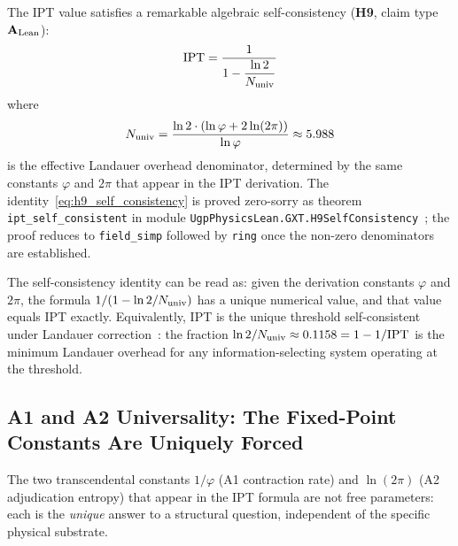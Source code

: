\documentclass[11pt,twocolumn]{article}
\newcommand{\CatAL}{\ensuremath{\textbf{A}_{\rm Lean}}}
\theoremstyle{remark}
\begin{document}
The IPT value satisfies a remarkable algebraic self-consistency (\textbf{H9}, claim type~$\CatAL$):
\begin{equation}
\label{eq:h9_self_consistency}
\text{IPT} = \frac{1}{1 - \dfrac{\ln 2}{N_{\rm univ}}}
\end{equation}
where
\[
  N_{\rm univ}
  = \frac{\ln 2 \cdot (\ln\varphi + 2\ln(2\pi))}{\ln\varphi}
  \approx 5.988
\]
is the effective Landauer overhead denominator, determined by the same
constants $\varphi$ and $2\pi$ that appear in the IPT derivation.  The
identity~\eqref{eq:h9_self_consistency} is proved zero-sorry as theorem
\texttt{ipt\_self\_consistent} in module
\texttt{UgpPhysicsLean.\allowbreak{}GXT.\allowbreak{}H9SelfConsistency}~\cite{SpivackUGPPhysicsLean};
the proof reduces to \texttt{field\_simp} followed by \texttt{ring} once the
non-zero denominators are established.

The self-consistency identity can be read as: given the derivation constants
$\varphi$ and $2\pi$, the formula $1/(1-\ln 2/N_{\rm univ})$ has a unique
numerical value, and that value equals IPT exactly.  Equivalently, IPT is
the unique threshold self-consistent under Landauer correction~\cite{Landauer1961}:
the fraction $\ln 2/N_{\rm univ} \approx 0.1158 = 1 - 1/\text{IPT}$ is the
minimum Landauer overhead for any information-selecting system operating at the
threshold.

\subsection{A1 and A2 Universality: The Fixed-Point Constants Are Uniquely Forced}
\label{sec:a1a2_universality}

The two transcendental constants $1/\varphi$ (A1 contraction rate) and
$\ln(2\pi)$ (A2 adjudication entropy) that appear in the IPT formula are not
free parameters: each is the \emph{unique} answer to a structural question,
independent of the specific physical substrate.
\end{document}

